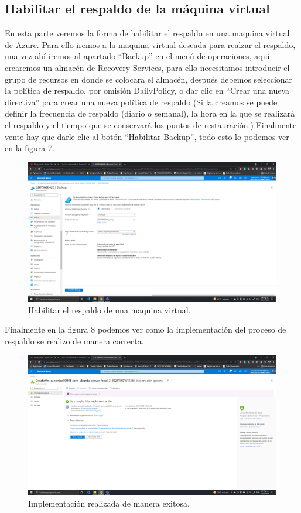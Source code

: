 \documentclass[11pt]{article}
\begin{document}
		\subsection{Habilitar el respaldo de la máquina virtual}
		En esta parte veremos la forma de habilitar el respaldo en una maquina virtual de Azure. Para ello iremos a la maquina virtual deseada para realzar el respaldo, una vez ahí iremos al apartado ``Backup'' en el menú de operaciones, aquí crearemos un almacén de Recovery Services, para ello necesitamos introducir el grupo de recursos en donde se colocara el almacén, después debemos seleccionar la política de respaldo, por omisión DailyPolicy, o dar clic en ``Crear una nueva directiva'' para crear una nueva política de respaldo (Si la creamos se puede definir la frecuencia de respaldo (diario o semanal), la hora en la que se realizará el respaldo y el tiempo que se conservará los puntos de restauración.) Finalmente vente hay que darle clic al botón ``Habilitar Backup'', todo esto lo podemos ver en  la figura 7.
		\begin{figure}[H]
			\centering
			\includegraphics[scale=0.34]{resources/1.F.png}
			\caption{Habilitar el respaldo de una maquina virtual.}\label{fig:picture}
		\end{figure}
		Finalmente en la figura 8 podemos ver como la implementación del proceso de respaldo se realizo de manera correcta.
		\begin{figure}[H]
			\centering
			\includegraphics[scale=0.34]{resources/1.3.png}
			\caption{Implementación realizada de manera exitosa.}\label{fig:picture}
		\end{figure}
\end{document}

